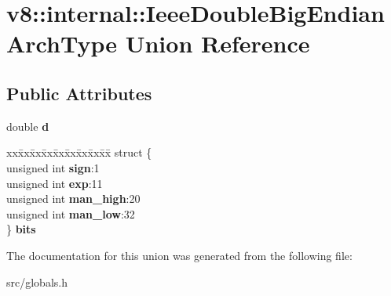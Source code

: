 \hypertarget{unionv8_1_1internal_1_1_ieee_double_big_endian_arch_type}{}\section{v8\+:\+:internal\+:\+:Ieee\+Double\+Big\+Endian\+Arch\+Type Union Reference}
\label{unionv8_1_1internal_1_1_ieee_double_big_endian_arch_type}
\subsection*{Public Attributes}
\begin{DoxyCompactItemize}
\item 
\hypertarget{unionv8_1_1internal_1_1_ieee_double_big_endian_arch_type_a08d5c0c44b46ddb10508790724f0f6a3}{}double {\bfseries d}\label{unionv8_1_1internal_1_1_ieee_double_big_endian_arch_type_a08d5c0c44b46ddb10508790724f0f6a3}

\item 
\hypertarget{unionv8_1_1internal_1_1_ieee_double_big_endian_arch_type_a89f481a918d15096ede31d0fe9bfbcdd}{}\begin{tabbing}
xx\=xx\=xx\=xx\=xx\=xx\=xx\=xx\=xx\=\kill
struct \{\\
\>unsigned int {\bfseries sign}:1\\
\>unsigned int {\bfseries exp}:11\\
\>unsigned int {\bfseries man\_high}:20\\
\>unsigned int {\bfseries man\_low}:32\\
\} {\bfseries bits}\label{unionv8_1_1internal_1_1_ieee_double_big_endian_arch_type_a89f481a918d15096ede31d0fe9bfbcdd}
\\

\end{tabbing}\end{DoxyCompactItemize}


The documentation for this union was generated from the following file\+:\begin{DoxyCompactItemize}
\item 
src/globals.\+h\end{DoxyCompactItemize}
